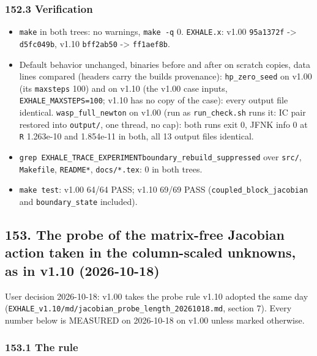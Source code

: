 \documentclass[english,a4paper]{my_memo}
\providecommand{\tightlist}{\setlength{\itemsep}{0pt}\setlength{\parskip}{0pt}}
\begin{document}
\subsubsection{152.3 Verification}\label{1523-verification}

\begin{itemize}
\tightlist
\item
  \texttt{make} in both trees: no warnings, \texttt{make\ -q} 0. \texttt{EXHALE.x}: v1.00 \texttt{95a1372f} -\textgreater{} \texttt{d5fc049b}, v1.10 \texttt{bff2ab50} -\textgreater{} \texttt{ff1aef8b}.
\item
  Default behavior unchanged, binaries before and after on scratch copies, data lines compared (headers carry the build\textquotesingle s provenance): \texttt{hp\_zero\_seed} on v1.00 (its \texttt{maxsteps} 100) and on v1.10 (the v1.00 case inputs, \texttt{EXHALE\_MAXSTEPS=100}; v1.10 has no copy of the case): every output file identical. \texttt{wasp\_full\_newton} on v1.00 (run as \texttt{run\_check.sh} runs it: IC pair restored into \texttt{output/}, one thread, no cap): both runs exit 0, JFNK info 0 at \texttt{\textbar{}\textbar{}R\textbar{}\textbar{}} 1.263e-10 and 1.854e-11 in both, all 13 output files identical.
\item
  \texttt{grep\ EXHALE\_TRACE\_EXPERIMENT\textbar{}boundary\_rebuild\_suppressed} over \texttt{src/}, \texttt{Makefile}, \texttt{README*}, \texttt{docs/*.tex}: 0 in both trees.
\item
  \texttt{make\ test}: v1.00 64/64 PASS; v1.10 69/69 PASS (\texttt{coupled\_block\_jacobian} and \texttt{boundary\_state} included).
\end{itemize}

\subsection{153. The probe of the matrix-free Jacobian action taken in the column-scaled unknowns, as in v1.10 (2026-10-18)}\label{153-the-probe-of-the-matrix-free-jacobian-action-taken-in-the-column-scaled-unknowns-as-in-v110-2026-10-18}

User decision 2026-10-18: v1.00 takes the probe rule v1.10 adopted the same day (\texttt{EXHALE\_v1.10/md/jacobian\_probe\_length\_20261018.md}, section 7). Every number below is MEASURED on 2026-10-18 on v1.00 unless marked otherwise.

\subsubsection{153.1 The rule}\label{1531-the-rule}
\end{document}
